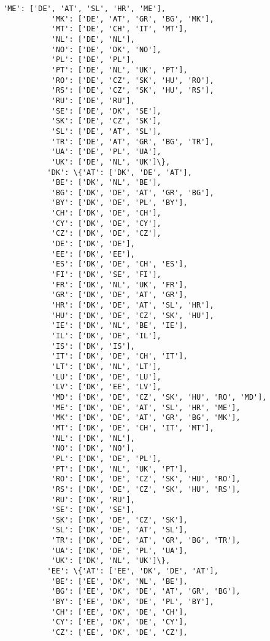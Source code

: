 \documentclass[11pt]{article}
\begin{document}
\begin{Verbatim}[commandchars=\\\{\}]
           'ME': ['DE', 'AT', 'SL', 'HR', 'ME'],
           'MK': ['DE', 'AT', 'GR', 'BG', 'MK'],
           'MT': ['DE', 'CH', 'IT', 'MT'],
           'NL': ['DE', 'NL'],
           'NO': ['DE', 'DK', 'NO'],
           'PL': ['DE', 'PL'],
           'PT': ['DE', 'NL', 'UK', 'PT'],
           'RO': ['DE', 'CZ', 'SK', 'HU', 'RO'],
           'RS': ['DE', 'CZ', 'SK', 'HU', 'RS'],
           'RU': ['DE', 'RU'],
           'SE': ['DE', 'DK', 'SE'],
           'SK': ['DE', 'CZ', 'SK'],
           'SL': ['DE', 'AT', 'SL'],
           'TR': ['DE', 'AT', 'GR', 'BG', 'TR'],
           'UA': ['DE', 'PL', 'UA'],
           'UK': ['DE', 'NL', 'UK']\},
          'DK': \{'AT': ['DK', 'DE', 'AT'],
           'BE': ['DK', 'NL', 'BE'],
           'BG': ['DK', 'DE', 'AT', 'GR', 'BG'],
           'BY': ['DK', 'DE', 'PL', 'BY'],
           'CH': ['DK', 'DE', 'CH'],
           'CY': ['DK', 'DE', 'CY'],
           'CZ': ['DK', 'DE', 'CZ'],
           'DE': ['DK', 'DE'],
           'EE': ['DK', 'EE'],
           'ES': ['DK', 'DE', 'CH', 'ES'],
           'FI': ['DK', 'SE', 'FI'],
           'FR': ['DK', 'NL', 'UK', 'FR'],
           'GR': ['DK', 'DE', 'AT', 'GR'],
           'HR': ['DK', 'DE', 'AT', 'SL', 'HR'],
           'HU': ['DK', 'DE', 'CZ', 'SK', 'HU'],
           'IE': ['DK', 'NL', 'BE', 'IE'],
           'IL': ['DK', 'DE', 'IL'],
           'IS': ['DK', 'IS'],
           'IT': ['DK', 'DE', 'CH', 'IT'],
           'LT': ['DK', 'NL', 'LT'],
           'LU': ['DK', 'DE', 'LU'],
           'LV': ['DK', 'EE', 'LV'],
           'MD': ['DK', 'DE', 'CZ', 'SK', 'HU', 'RO', 'MD'],
           'ME': ['DK', 'DE', 'AT', 'SL', 'HR', 'ME'],
           'MK': ['DK', 'DE', 'AT', 'GR', 'BG', 'MK'],
           'MT': ['DK', 'DE', 'CH', 'IT', 'MT'],
           'NL': ['DK', 'NL'],
           'NO': ['DK', 'NO'],
           'PL': ['DK', 'DE', 'PL'],
           'PT': ['DK', 'NL', 'UK', 'PT'],
           'RO': ['DK', 'DE', 'CZ', 'SK', 'HU', 'RO'],
           'RS': ['DK', 'DE', 'CZ', 'SK', 'HU', 'RS'],
           'RU': ['DK', 'RU'],
           'SE': ['DK', 'SE'],
           'SK': ['DK', 'DE', 'CZ', 'SK'],
           'SL': ['DK', 'DE', 'AT', 'SL'],
           'TR': ['DK', 'DE', 'AT', 'GR', 'BG', 'TR'],
           'UA': ['DK', 'DE', 'PL', 'UA'],
           'UK': ['DK', 'NL', 'UK']\},
          'EE': \{'AT': ['EE', 'DK', 'DE', 'AT'],
           'BE': ['EE', 'DK', 'NL', 'BE'],
           'BG': ['EE', 'DK', 'DE', 'AT', 'GR', 'BG'],
           'BY': ['EE', 'DK', 'DE', 'PL', 'BY'],
           'CH': ['EE', 'DK', 'DE', 'CH'],
           'CY': ['EE', 'DK', 'DE', 'CY'],
           'CZ': ['EE', 'DK', 'DE', 'CZ'],

\end{Verbatim}
\end{document}
